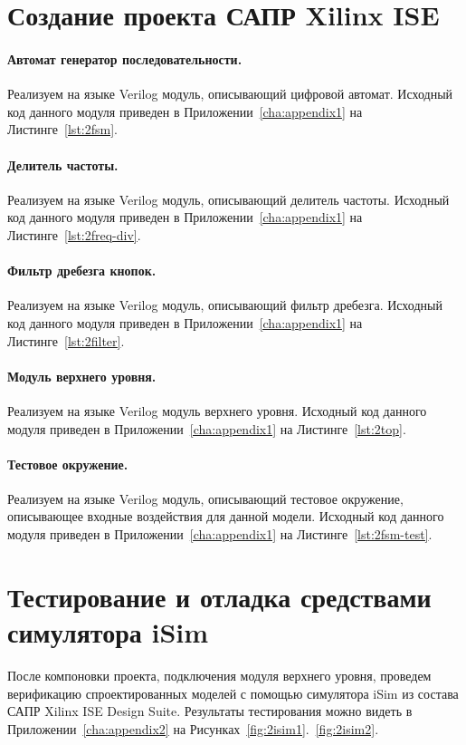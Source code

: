 \newpage
\section{Создание проекта САПР Xilinx ISE}

\paragraph{Автомат генератор последовательности.}
Реализуем на языке Verilog модуль, описывающий цифровой автомат. 
Исходный код данного модуля приведен в Приложении~\ref{cha:appendix1} на Листинге~\ref{lst:2fsm}.
\paragraph{Делитель частоты.}
Реализуем на языке Verilog модуль, описывающий делитель частоты.
Исходный код данного модуля приведен в Приложении~\ref{cha:appendix1} на Листинге~\ref{lst:2freq-div}.

\paragraph{Фильтр дребезга кнопок.}
Реализуем на языке Verilog модуль, описывающий фильтр дребезга.
Исходный код данного модуля приведен в Приложении~\ref{cha:appendix1} на Листинге~\ref{lst:2filter}.

\paragraph{Модуль верхнего уровня.}
Реализуем на языке Verilog модуль верхнего уровня.
Исходный код данного модуля приведен в Приложении~\ref{cha:appendix1} на Листинге~\ref{lst:2top}.


\paragraph{Тестовое окружение.}
Реализуем на языке Verilog модуль, описывающий тестовое окружение, описывающее входные воздействия для данной модели.
Исходный код данного модуля приведен в Приложении~\ref{cha:appendix1} на Листинге~\ref{lst:2fsm-test}.


\section{Тестирование и отладка средствами симулятора iSim}
После компоновки проекта, подключения модуля верхнего уровня, проведем верификацию спроектированных моделей с помощью симулятора iSim из состава САПР Xilinx ISE Design Suite. Результаты тестирования можно видеть в Приложении~\ref{cha:appendix2} на Рисунках~\ref{fig:2isim1}.~\ref{fig:2isim2}.



